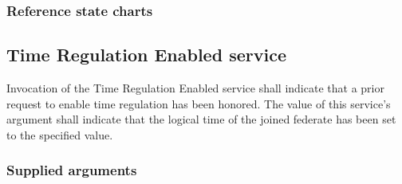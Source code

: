 \begin{compactstdpage}
    \subsubsection{Reference state charts}


    \subsection{Time Regulation Enabled \rtiinitiated{} service}

    Invocation of the Time Regulation Enabled \rtiinitiated{} service shall indicate that a prior request to enable time regulation has been honored. The value of this service's argument shall indicate that the logical time of the joined federate has been set to the specified value.

    \subsubsection{Supplied arguments}



\end{compactstdpage}

\clearpage

